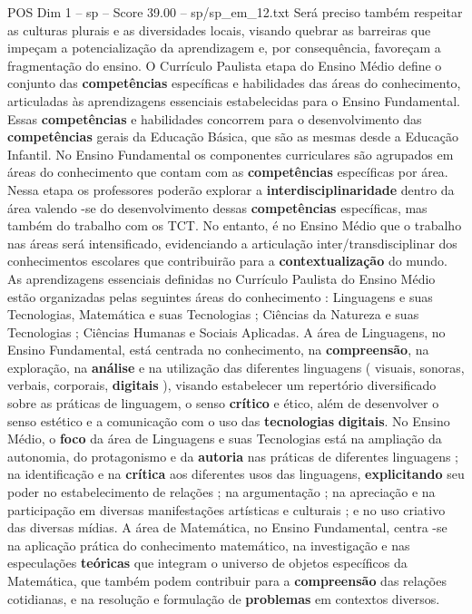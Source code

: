 \begin{textsample}{POS Dim 1 – sp – Score 39.00 – sp/sp\_em\_12.txt}
Será preciso também respeitar as culturas plurais e as diversidades locais, visando quebrar as barreiras que impeçam a potencialização da aprendizagem e, por consequência, favoreçam a fragmentação do ensino.
O Currículo Paulista etapa do Ensino Médio define o conjunto das \textbf{competências} específicas e habilidades das áreas do conhecimento, articuladas às aprendizagens essenciais estabelecidas para o Ensino Fundamental.
Essas \textbf{competências} e habilidades concorrem para o desenvolvimento das \textbf{competências} gerais da Educação Básica, que são as mesmas desde a Educação Infantil.
No Ensino Fundamental os componentes curriculares são agrupados em áreas do conhecimento que contam com as \textbf{competências} específicas por área.
Nessa etapa os professores poderão explorar a \textbf{interdisciplinaridade} dentro da área valendo -se do desenvolvimento dessas \textbf{competências} específicas, mas também do trabalho com os TCT.
No entanto, é no Ensino Médio que o trabalho nas áreas será intensificado, evidenciando a articulação inter/transdisciplinar dos conhecimentos escolares que contribuirão para a \textbf{contextualização} do mundo.
As aprendizagens essenciais definidas no Currículo Paulista do Ensino Médio estão organizadas pelas seguintes áreas do conhecimento : Linguagens e suas Tecnologias, Matemática e suas Tecnologias ; Ciências da Natureza e suas Tecnologias ; Ciências Humanas e Sociais Aplicadas.
A área de Linguagens, no Ensino Fundamental, está centrada no conhecimento, na \textbf{compreensão}, na exploração, na \textbf{análise} e na utilização das diferentes linguagens ( visuais, sonoras, verbais, corporais, \textbf{digitais} ), visando estabelecer um repertório diversificado sobre as práticas de linguagem, o senso \textbf{crítico} e ético, além de desenvolver o senso estético e a comunicação com o uso das \textbf{tecnologias} \textbf{digitais}.
No Ensino Médio, o \textbf{foco} da área de Linguagens e suas Tecnologias está na ampliação da autonomia, do protagonismo e da \textbf{autoria} nas práticas de diferentes linguagens ; na identificação e na \textbf{crítica} aos diferentes usos das linguagens, \textbf{explicitando} seu poder no estabelecimento de relações ; na argumentação ; na apreciação e na participação em diversas manifestações artísticas e culturais ; e no uso criativo das diversas mídias.
A área de Matemática, no Ensino Fundamental, centra -se na aplicação prática do conhecimento matemático, na investigação e nas especulações \textbf{teóricas} que integram o universo de objetos específicos da Matemática, que também podem contribuir para a \textbf{compreensão} das relações cotidianas, e na resolução e formulação de \textbf{problemas} em contextos diversos.

\end{textsample}
